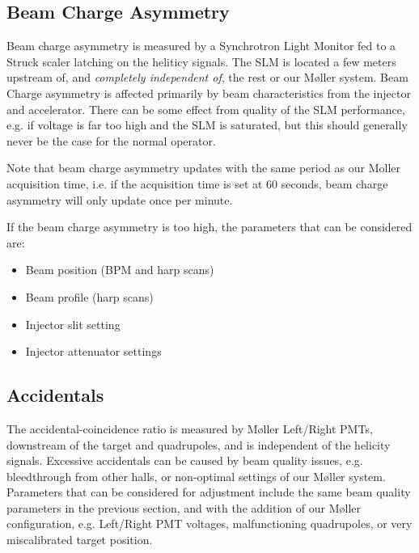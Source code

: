 \documentclass[amsmath,amssymb,notitlepage,12pt]{revtex4}
\begin{document}
\subsection{Beam Charge Asymmetry}
Beam charge asymmetry is measured by a Synchrotron Light Monitor fed to a Struck scaler latching on the heliticy signals.  The SLM is located a few meters upstream of, and {\em completely independent of}, the rest or our M{\o}ller system.  Beam Charge asymmetry is affected primarily by beam characteristics from the injector and accelerator.  There can be some effect from quality of the SLM performance, e.g. if voltage is far too high and the SLM is saturated, but this should generally never be the case for the normal operator.

Note that beam charge asymmetry updates with the same period as our Moller acquisition time, i.e. if the acquisition time is set at 60 seconds, beam charge asymmetry will only update once per minute.%

If the beam charge asymmetry is too high, the parameters that can be considered are:
\begin{itemize}
\vspace{-4mm}\item Beam position (BPM and harp scans)
\vspace{-4mm}\item Beam profile (harp scans)
\vspace{-4mm}\item Injector slit setting
\vspace{-4mm}\item Injector attenuator settings
\end{itemize}

\subsection{Accidentals}
The accidental-coincidence ratio is measured by M{\o}ller Left/Right PMTs, downstream of the target and quadrupoles, and is independent of the helicity signals.  Excessive accidentals can be caused by beam quality issues, e.g. bleedthrough from other halls, or non-optimal settings of our M{\o}ller system.  Parameters that can be considered for adjustment include the same beam quality parameters in the previous section, and with the addition of our M{\o}ller configuration, e.g. Left/Right PMT voltages, malfunctioning quadrupoles, or very miscalibrated target position.
\end{document}
